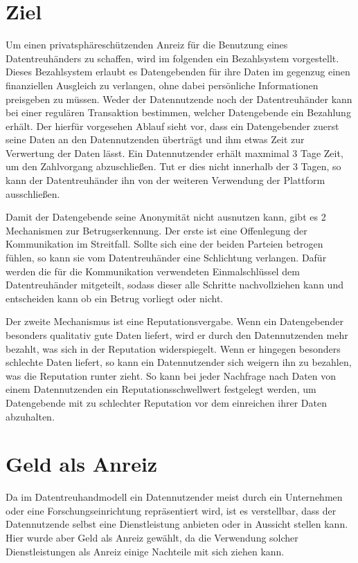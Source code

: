 \documentclass[11pt,a4paper]{scrreprt}
\begin{document}



\section{Ziel}
Um einen privatsphäreschützenden Anreiz für die Benutzung eines Datentreuhänders zu schaffen, wird im folgenden ein Bezahlsystem vorgestellt. Dieses Bezahlsystem erlaubt es Datengebenden für ihre Daten im gegenzug einen finanziellen Ausgleich zu verlangen, ohne dabei persönliche Informationen preisgeben zu müssen. Weder der Datennutzende noch der Datentreuhänder kann bei einer regulären Transaktion bestimmen, welcher Datengebende ein Bezahlung erhält. Der hierfür vorgesehen Ablauf sieht vor, dass ein Datengebender zuerst seine Daten an den Datennutzenden überträgt und ihm etwas Zeit zur Verwertung der Daten lässt. Ein Datennutzender erhält maxmimal 3 Tage Zeit, um den Zahlvorgang abzuschließen. Tut er dies nicht innerhalb der 3 Tagen, so kann der Datentreuhänder ihn von der weiteren Verwendung der Plattform ausschließen. 

Damit der Datengebende seine Anonymität nicht ausnutzen kann, gibt es 2 Mechanismen zur Betrugserkennung. Der erste ist eine Offenlegung der Kommunikation im Streitfall. Sollte sich eine der beiden Parteien betrogen fühlen, so kann sie vom Datentreuhänder eine Schlichtung verlangen. Dafür werden die für die Kommunikation verwendeten Einmalschlüssel dem Datentreuhänder mitgeteilt, sodass dieser alle Schritte nachvollziehen kann und entscheiden kann ob ein Betrug vorliegt oder nicht. 

Der zweite Mechanismus ist eine Reputationsvergabe. Wenn ein Datengebender besonders qualitativ gute Daten liefert, wird er durch den Datennutzenden mehr bezahlt, was sich in der Reputation widerspiegelt. Wenn er hingegen besonders schlechte Daten liefert, so kann ein Datennutzender sich weigern ihn zu bezahlen, was die Reputation runter zieht. So kann bei jeder Nachfrage nach Daten von einem Datennutzenden ein Reputationsschwellwert festgelegt werden, um Datengebende mit zu schlechter Reputation vor dem einreichen ihrer Daten abzuhalten. 

\section{Geld als Anreiz}
Da im Datentreuhandmodell ein Datennutzender meist durch ein Unternehmen oder eine Forschungseinrichtung repräsentiert wird, ist es verstellbar, dass der Datennutzende selbst eine Dienstleistung anbieten oder in Aussicht stellen kann. Hier wurde aber Geld als Anreiz gewählt, da die Verwendung solcher Dienstleistungen als Anreiz einige Nachteile mit sich ziehen kann.
\end{document}
